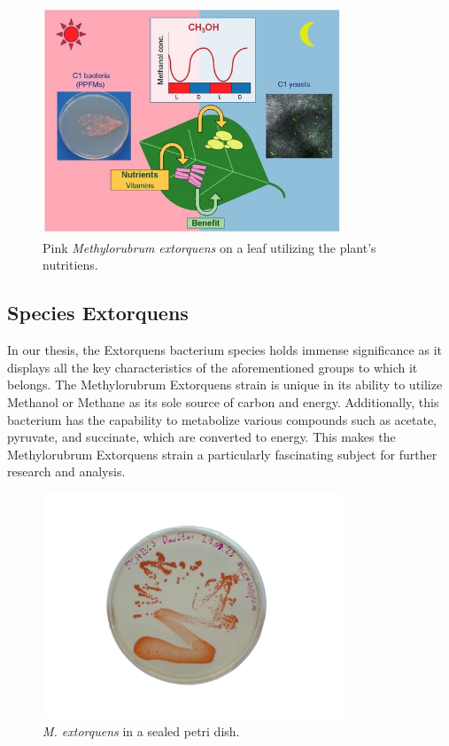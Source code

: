 \begin{figure}[H]
    \centering
    \includegraphics[width=0.8\textwidth]{./media/images/mextorquens_on_leaf}
    \caption{Pink \emph{Methylorubrum extorquens} on a leaf utilizing the plant's nutritiens.}
    \label{fig:mextorquens_on_leaf}
\end{figure}

\subsection{Species Extorquens}
In our thesis, the Extorquens bacterium species holds immense significance as it displays
all the key characteristics of the aforementioned groups to which it belongs. The
Methylorubrum Extorquens strain is unique in its ability to utilize Methanol or Methane
as its sole source of carbon and energy. Additionally, this bacterium has the capability to
metabolize various compounds such as acetate, pyruvate, and succinate, which are
converted to energy. This makes the Methylorubrum Extorquens strain a particularly
fascinating subject for further research and analysis.

\begin{figure}[H]
    \centering
    \includegraphics[width=0.8\textwidth]{./media/images/mextorquens_sealed}
    \caption{\emph{M. extorquens} in a sealed petri dish.}
    \label{fig:mextorquens_petri_sealed}
\end{figure}


